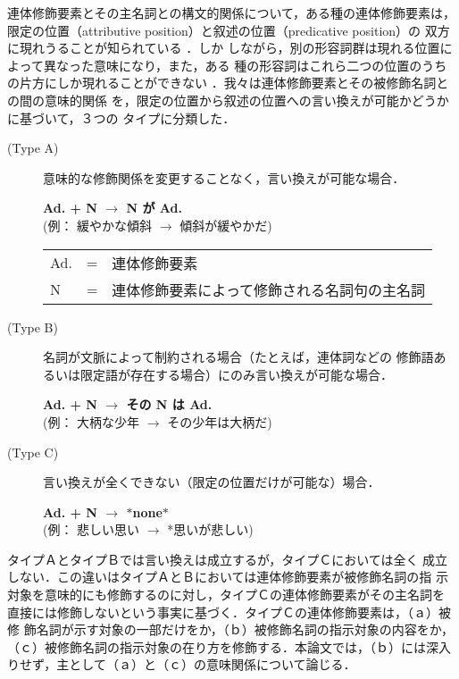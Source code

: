 連体修飾要素とその主名詞との構文的関係について，ある種の連体修飾要素は，
限定の位置（attributive position）と叙述の位置（predicative position）の
双方に現れうることが知られている \cite{Sakuma67j,Martin75,Makino86}．しか
しながら，別の形容詞群は現れる位置によって異なった意味になり，また，ある
種の形容詞はこれら二つの位置のうちの片方にしか現れることができない 
\cite{Hashimoto92j}．我々は連体修飾要素とその被修飾名詞との間の意味的関係
を，限定の位置から叙述の位置への言い換えが可能かどうかに基づいて，３つの
タイプに分類した．

\vspace*{5mm}

\begin{description}

\item[(Type A)] 意味的な修飾関係を変更することなく，言い換えが可能な場合． 

  {\bf Ad. + N $\rightarrow$ N が Ad. } \\   
  (例： 緩やかな傾斜 $\rightarrow$ 傾斜が緩やかだ)

  \begin{tabular}[c]{llp{10cm}}
    Ad. & = & 連体修飾要素 \\
    N & = & 連体修飾要素によって修飾される名詞句の主名詞
  \end{tabular}
  \normalsize

\item[(Type B)]名詞が文脈によって制約される場合（たとえば，連体詞などの
修飾語あるいは限定語が存在する場合）にのみ言い換えが可能な場合．

  {\bf Ad. + N $\rightarrow$ その N は Ad. } \\
  (例： 大柄な少年 $\rightarrow$ その少年は大柄だ)

\clearpage

\item[(Type C)]言い換えが全くできない（限定の位置だけが可能な）場合．

  {\bf Ad. + N $\rightarrow$ $*$none$*$}\\
  (例： 悲しい思い $\rightarrow$ *思いが悲しい)

\vspace*{5mm}

\end{description}

タイプＡとタイプＢでは言い換えは成立するが，タイプＣにおいては全く
成立しない．この違いはタイプＡとＢにおいては連体修飾要素が被修飾名詞の指
示対象を意味的にも修飾するのに対し，タイプＣの連体修飾要素がその主名詞を
直接には修飾しないという事実に基づく．タイプＣの連体修飾要素は，（ａ）被修
飾名詞が示す対象の一部だけをか，（ｂ）被修飾名詞の指示対象の内容をか，
（ｃ）被修飾名詞の指示対象の在り方を修飾する．本論文では，（ｂ）には深入
りせず，主として（ａ）と（ｃ）の意味関係について論じる．

